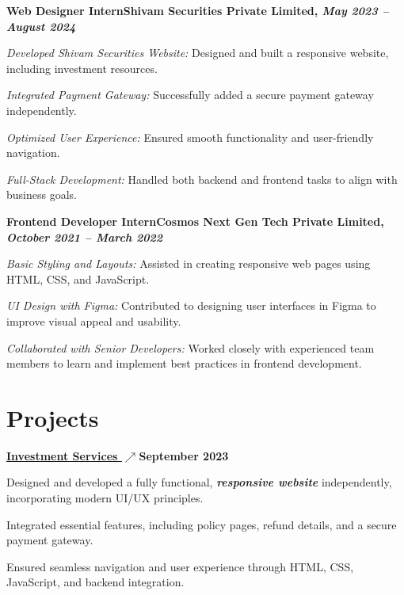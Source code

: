\documentclass[letterpaper,10pt]{article}
\newcommand{\heading}[2]{
  \hspace{10pt}#1\hfill#2\\
}
\newcommand{\headingBf}[2]{
  \heading{\textbf{#1}}{\textbf{#2}}
}
\newenvironment{resume_list}{
  \vspace{-7pt}
  \begin{itemize}[itemsep=-2px, parsep=1pt, leftmargin=30pt]
}{
  \end{itemize}
}
\begin{document}
  \headingBf{Web Designer Intern}{Shivam Securities Private Limited, \textit{May 2023 -- August 2024}}  \vspace{3pt}
  \begin{resume_list}
    \item \textit{Developed Shivam Securities Website:} Designed and built a responsive website, including investment resources.
    \item \textit{Integrated Payment Gateway:} Successfully added a secure payment gateway independently.
    \item \textit{Optimized User Experience:} Ensured smooth functionality and user-friendly navigation.
    \item \textit{Full-Stack Development:} Handled both backend and frontend tasks to align with business goals.
  \end{resume_list}

  \headingBf{Frontend Developer Intern}{Cosmos Next Gen Tech Private Limited, \textit{October 2021 -- March 2022}}  \vspace{3pt}
  \begin{resume_list}
    \item \textit{Basic Styling and Layouts:} Assisted in creating responsive web pages using HTML, CSS, and JavaScript.
    \item \textit{UI Design with Figma:} Contributed to designing user interfaces in Figma to improve visual appeal and usability.
    \item \textit{Collaborated with Senior Developers:} Worked closely with experienced team members to learn and implement best practices in frontend development.
  \end{resume_list}


  \section{Projects}

    \headingBf {\underline{\href{https://shivamsecurities.com/}{Investment Services \(\nearrow\)}}}{September 2023}  \vspace{4pt}
    \begin{resume_list}
    \item Designed and developed a fully functional, \textit{\textbf{responsive website}} independently, incorporating modern UI/UX principles.
    \item Integrated essential features, including policy pages, refund details, and a secure payment gateway.
    \item Ensured seamless navigation and user experience through HTML, CSS, JavaScript, and backend integration.
    \end{resume_list} 
    
\end{document}

